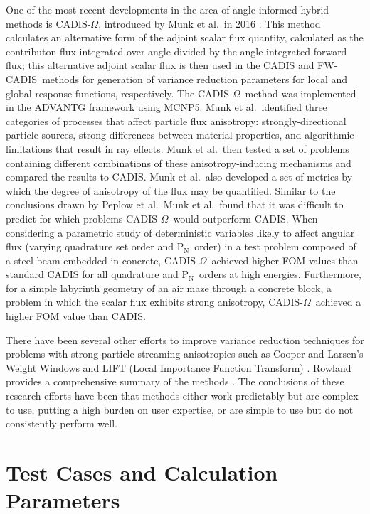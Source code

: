 \documentclass{article} %
\newcommand{\pn}{P$_\mathrm{N}$}
\newcommand{\fwc}{\mbox{FW-CADIS}}
\newcommand{\co}{\mbox{CADIS-$\Omega$}}
\begin{document}
One of the most recent developments in the area of angle-informed hybrid
methods is \co, introduced by Munk et al.\ in 2016 \cite{cadisom}. This method
calculates an alternative form of the adjoint scalar flux quantity, calculated
as the contributon flux integrated over angle divided by the angle-integrated
forward flux; this alternative adjoint scalar flux is then used in the CADIS
and \fwc\ methods for generation of variance reduction parameters for local
and global response functions, respectively. The \co\ method was implemented
in the ADVANTG framework using MCNP5. Munk et al.\ identified three categories
of processes that affect particle flux anisotropy: strongly-directional
particle sources, strong differences between material properties, and
algorithmic limitations that result in ray effects. Munk et al.\ then tested a
set of problems containing different combinations of these anisotropy-inducing
mechanisms and compared the results to CADIS. Munk et al.\ also developed a
set of metrics by which the degree of anisotropy of the flux may be
quantified. Similar to the conclusions drawn by Peplow et al.\, Munk et al.\
found that it was difficult to predict for which problems \co\ would
outperform CADIS. When considering a parametric study of deterministic
variables likely to affect angular flux (varying quadrature set order and \pn\
order) in a test problem composed of a steel beam embedded in concrete, \co\
achieved higher FOM values than standard CADIS for all quadrature and \pn\
orders at high energies. Furthermore, for a simple labyrinth geometry of an air
maze through a concrete block, a problem in which the scalar flux exhibits strong
anisotropy, \co\ achieved a higher FOM value than CADIS.

There have been several other efforts to improve variance reduction techniques
for problems with strong particle streaming anisotropies such as Cooper and
Larsen's Weight Windows \cite{clww} and LIFT (Local Importance Function
Transform) \cite{lift1, lift2}. Rowland provides a comprehensive summary of the
methods \cite{kr}. The conclusions of these research efforts have
been that methods either work predictably but are complex to use, putting a
high burden on user expertise, or are simple to use but do not consistently
perform well.

\section{Test Cases and Calculation Parameters}
\end{document}
